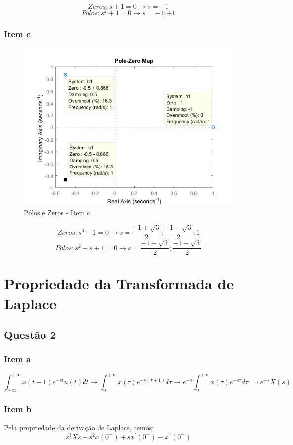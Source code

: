 \documentclass[a4paper, 12pt]{article}
\begin{document}
        \[Zeros: s + 1 = 0 \rightarrow s = -1\]
        \[Polos:  s^{2} + 1 = 0 \rightarrow s = {-1; +1}\]
        \newpage
        \subsubsection{Item c}
		\begin{figure}[!ht]
			\centering
			\includegraphics{img/Q1c.png}
			\caption{P\'{o}los e Zeros - Item c}	
		\end{figure}	   
		
		\[Zeros: s^{3} - 1 = 0 \rightarrow s = {\frac{-1 + \sqrt{3}}{2}; \frac{-1 - \sqrt{3}}{2}; 1}\]
		\[Polos:  s^{2} + s + 1 = 0 \rightarrow s = {\frac{-1 + \sqrt{3}}{2}; \frac{-1 - \sqrt{3}}{2}}\]        
\section{Propriedade da Transformada de Laplace}
    \subsection{Quest\~{a}o 2}
        \subsubsection{Item a}
			\[\int_{-\infty}^{+\infty} x(t-1)e^{-st}u(t)dt \rightarrow \int_{0}^{+\infty}x(\tau)e^{-s(\tau + 1)}d\tau \rightarrow e^{-s}\int_{0}^{+\infty}x(\tau)e^{-s\tau}d\tau\ \Rightarrow e^{-s}X(s)\]
        \subsubsection{Item b}
        Pela propriedade da derivação de Laplace, temos:
        \[s^3X{s} - s^2x(0^{-}) + sx^{'}(0^{-}) - x^{''}(0^{-})\]
\end{document}
